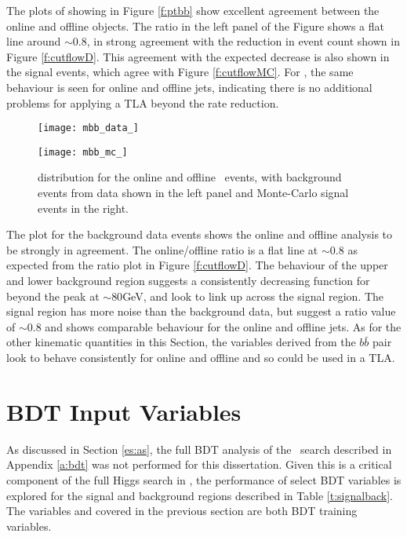         The plots of \ptbb showing in Figure \ref{f:ptbb} show excellent agreement between the online and offline objects. The ratio in the left panel of the Figure shows a flat line around $\sim0.8$, in strong agreement with the reduction in event count shown in Figure \ref{f:cutflowD}. This agreement with the expected decrease is also shown in the signal events, which agree with Figure \ref{f:cutflowMC}. For \ptbb, the same behaviour is seen for online and offline jets, indicating there is no additional problems for applying a TLA beyond the rate reduction.

        \begin{figure}[h]
            \centering
            \begin{minipage}[h]{0.48\linewidth}
                \texttt{[image: mbb\_data\_]}
            \end{minipage}
            \quad
            \begin{minipage}[h]{0.48\linewidth}
                \texttt{[image: mbb\_mc\_]}
            \end{minipage}
            \caption[Comparison of the \mbb distribution of the \VBFHBB\ events for HLT and offline objects]{\mbb distribution for the online and offline \VBFHBB\ events, with background events from data shown in the left panel and Monte-Carlo signal events in the right.}
            \label{f:mbb}
        \end{figure}

        The \mbb plot for the background data events shows the online and offline analysis to be strongly in agreement. The online/offline ratio is a flat line at $\sim0.8$ as expected from the ratio plot in Figure \ref{f:cutflowD}. The behaviour of the upper and lower background region suggests a consistently decreasing function for \mbb beyond the peak at \pt$\sim80$GeV, and look to link up across the signal region. The signal region has more noise than the background data, but suggest a ratio value of $\sim0.8$ and shows comparable behaviour for the online and offline jets. As for the other kinematic quantities in this Section, the variables derived from the $b\bar{b}$ pair look to behave consistently for online and offline and so could be used in a TLA.
\section{BDT Input Variables}

    As discussed in Section \ref{es:as}, the full BDT analysis of the \VBFHBB\ search described in Appendix \ref{a:bdt} was not performed for this dissertation. Given this is a critical component of the full Higgs search \cite{VBFHbb8tev} in \VBFHBB, the performance of select BDT variables is explored for the signal and background regions described in Table \ref{t:signalback}. The variables \mjj and \ptjj covered in the previous section are both BDT training variables.

